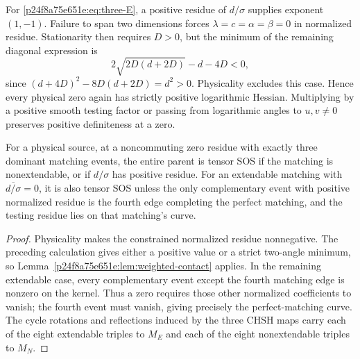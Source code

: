 For \eqref{p24f8a75e651e:eq:three-E}, a positive residue of $d/\sigma$ supplies exponent $(1,-1)$. Failure to span two dimensions forces $\lambda=c=\alpha=\beta=0$ in normalized residue. Stationarity then requires $D>0$, but the minimum of the remaining diagonal expression is
\[
2\sqrt{2D(d+2D)}-d-4D<0,
\]
since $(d+4D)^2-8D(d+2D)=d^2>0$. Physicality excludes this case. Hence every physical zero again has strictly positive logarithmic Hessian. Multiplying by a positive smooth testing factor or passing from logarithmic angles to $u,v\ne0$ preserves positive definiteness at a zero.

\begin{theorem}\label{p24f8a75e651e:thm:three-event-weighted}
For a physical source, at a noncommuting zero residue with exactly three dominant matching events, the entire parent is tensor SOS if the matching is nonextendable, or if $d/\sigma$ has positive residue. For an extendable matching with $\overline{d/\sigma}=0$, it is also tensor SOS unless the only complementary event with positive normalized residue is the fourth edge completing the perfect matching, and the testing residue lies on that matching's curve.
\end{theorem}
\begin{proof}
Physicality makes the constrained normalized residue nonnegative. The preceding calculation gives either a positive value or a strict two-angle minimum, so Lemma~\ref{p24f8a75e651e:lem:weighted-contact} applies. In the remaining extendable case, every complementary event except the fourth matching edge is nonzero on the kernel. Thus a zero requires those other normalized coefficients to vanish; the fourth event must vanish, giving precisely the perfect-matching curve. The cycle rotations and reflections induced by the three CHSH maps carry each of the eight extendable triples to $M_E$ and each of the eight nonextendable triples to $M_N$.
\end{proof}

